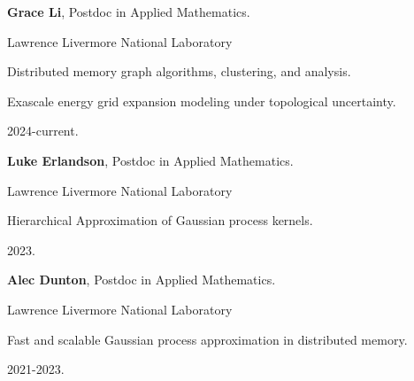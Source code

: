\begin{innerlist}

  \item[] \textbf{Grace Li},
  Postdoc in Applied Mathematics.
  \begin{innerlist}
    \item[-] Lawrence Livermore National Laboratory
    \item[-] Distributed memory graph algorithms, clustering, and analysis.
    \item[-] Exascale energy grid expansion modeling under topological uncertainty.
    \item[-] 2024-current.
  \end{innerlist}

  \item[] \textbf{Luke Erlandson},
  Postdoc in Applied Mathematics.
  \begin{innerlist}
    \item[-] Lawrence Livermore National Laboratory
    \item[-] Hierarchical Approximation of Gaussian process kernels.
    \item[-] 2023.
  \end{innerlist}
  
  \item[] \textbf{Alec Dunton},
  Postdoc in Applied Mathematics.
  \begin{innerlist}
    \item[-] Lawrence Livermore National Laboratory
    \item[-] Fast and scalable Gaussian process approximation in distributed memory.
    \item[-] 2021-2023.
  \end{innerlist}

\end{innerlist}
